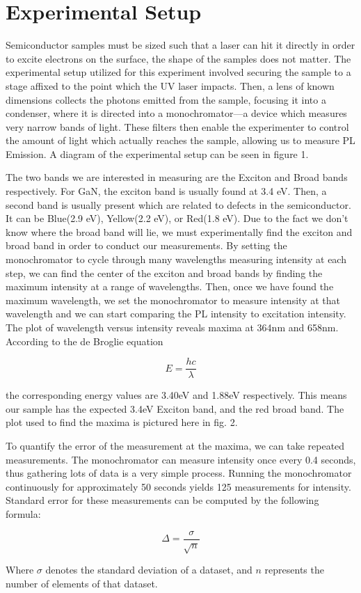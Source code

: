 \section{Experimental Setup}
	Semiconductor samples must be sized such that a laser can hit it directly in order to excite electrons on the surface, the shape of the samples does not matter. The experimental setup utilized for this experiment involved securing the sample to a stage affixed to the point which the UV laser impacts. Then, a lens of known dimensions collects the photons emitted from the sample, focusing it into a condenser, where it is directed into a monochromator—a device which measures very narrow bands of light. These filters then enable the experimenter to control the amount of light which actually reaches the sample, allowing us to measure PL Emission. A diagram of the experimental setup can be seen in figure 1.

	The two bands we are interested in measuring are the Exciton and Broad bands respectively. For GaN, the exciton band is usually found at 3.4 eV. Then, a second band is usually present which are related to defects in the semiconductor. It can be Blue(2.9 eV), Yellow(2.2 eV), or Red(1.8 eV). Due to the fact we don’t know where the broad band will lie, we must experimentally find the exciton and broad band in order to conduct our measurements.
By setting the monochromator to cycle through many wavelengths measuring intensity at each step, we can find the center of the exciton and broad bands by finding the maximum intensity at a range of wavelengths. Then, once we have found the maximum wavelength, we set the monochromator to measure intensity at that wavelength and we can start comparing the PL intensity to excitation intensity.
The plot of wavelength versus intensity reveals maxima at 364nm and 658nm. According to the de Broglie equation 

\begin{equation}
     E=\dfrac{hc}{\lambda}
\end{equation}

 the corresponding energy values are 3.40eV and 1.88eV respectively. This means our sample has the expected 3.4eV Exciton band, and the red broad band. The plot used to find the maxima is pictured here in fig. 2.

	To quantify the error of the measurement at the maxima, we can take repeated measurements. The monochromator can measure intensity once every 0.4 seconds, thus gathering lots of data is a very simple process. Running the monochromator continuously for approximately 50 seconds yields 125 measurements for intensity. Standard error for these measurements can be computed by the following formula:

\begin{equation}
	\Delta = \dfrac{\sigma}{\sqrt{n}}
\end{equation}

Where $\sigma$ denotes the standard deviation of a dataset, and $n$ represents the number of elements of that dataset.
